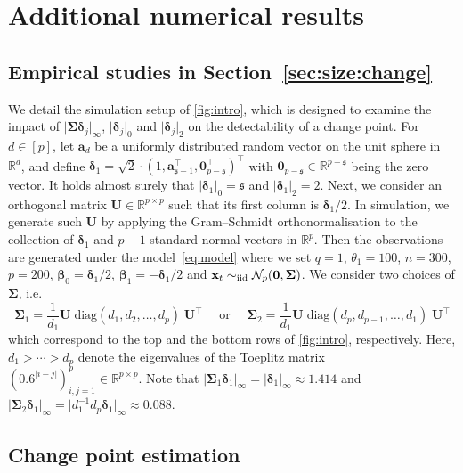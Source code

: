 \documentclass[11pt, a4paper]{article}
\newcommand{\mbf}{\mathbf}
\newcommand{\mc}{\mathcal}
\newcommand{\cp}{\theta}
\newcommand{\R}{\mathbb{R}}
\newcommand{\iid}{\text{\upshape iid}}
\theoremstyle{definition}
\theoremstyle{definition}
\theoremstyle{definition}
\theoremstyle{definition}
\theoremstyle{definition}
\theoremstyle{remark}
\theoremstyle{definition}
\theoremstyle{definition}
\theoremstyle{definition}
\begin{document}
\clearpage

\section{Additional numerical results}

\subsection{Empirical studies in Section~\ref{sec:size:change}}
\label{sec:sim:intro}

We detail the simulation setup of \cref{fig:intro}, which is designed to examine the impact of $\vert\bm\Sigma\bm\delta_j\vert_{\infty}$, $\vert\bm\delta_j\vert_0$ and $\vert\bm\delta_j\vert_2$ on the detectability of a change point.
For $d \in [p]$, let $\bm a_d$ be a uniformly distributed random vector on the unit sphere in $\R^d$, and define $\bm\delta_1 = \sqrt{2} \cdot (1, \bm a_{\mathfrak s - 1}^\top, \bm 0_{p-\mathfrak s}^\top)^\top$ with $\bm 0_{p-\mathfrak s}\in\R^{p-\mathfrak s}$ being the zero vector. It holds almost surely that $\vert\bm\delta_1 \vert_0 = \mathfrak s$ and $\vert\bm\delta_1 \vert_2 = 2$. 
Next, we consider an orthogonal matrix $\mbf U \in \R^{p\times p}$ such that its first column is $\bm\delta_1/2$. In simulation, we generate such $\mbf U$ by applying the Gram--Schmidt orthonormalisation to the collection of $\bm\delta_1$ and $p-1$ standard normal vectors in $\R^p$. Then the observations are generated under the model~\eqref{eq:model} where we set $q = 1$, $\cp_1 = 100$, $n = 300$, $p = 200$, $\bm\beta_0 = \bm\delta_1/2$, $\bm\beta_1 = -\bm\delta_1/2$ and $\mbf x_t \sim_{\iid} \mc N_p(\mbf 0, \bm\Sigma)$. We consider two choices of $\bm\Sigma$, i.e.\
$$
\bm\Sigma_{1} = \frac{1}{d_1}\mbf U\; \mathrm{diag}(d_1,d_2,\ldots,d_p) \;\mbf U^\top \quad\text{ or }\quad
\bm\Sigma_{2} = \frac{1}{d_1}\mbf U\; \mathrm{diag}(d_p,d_{p-1},\ldots,d_1)\; \mbf U^\top
$$
which correspond to the top and the bottom rows of \cref{fig:intro}, respectively. Here, $d_1 > \cdots > d_p$ denote the eigenvalues of the Toeplitz matrix $\left(0.6^{\vert i - j \vert}\right)_{i,j=1}^p \in \R^{p\times p}$. Note that $\vert\bm\Sigma_1\bm\delta_1\vert_{\infty} = \vert\bm\delta_1\vert_{\infty} \approx 1.414$ and  $\vert\bm\Sigma_2\bm\delta_1\vert_{\infty} = \vert d_1^{-1}d_p\bm\delta_1\vert_{\infty} \approx 0.088$.


\clearpage

\subsection{Change point estimation}\label{sec:add:cp}
\end{document}
